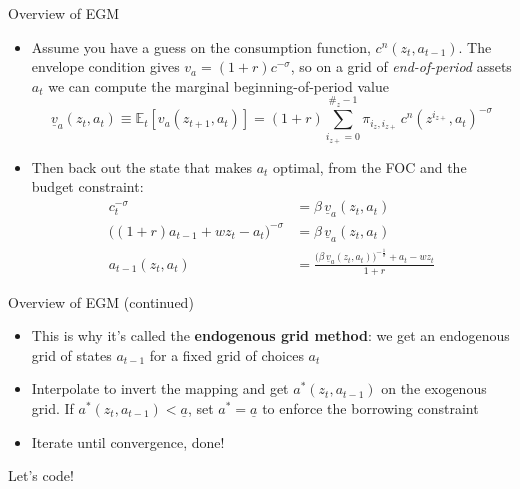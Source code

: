 \documentclass[
  10pt,
  ignorenonframetext,
  aspectratio=43,
  english,
]{beamer}
\providecommand{\tightlist}{%
  \setlength{\itemsep}{0pt}\setlength{\parskip}{0pt}}
\begin{document}
\begin{frame}{Overview of EGM}
\protect{}\label{overview-of-egm}
\begin{itemize}
\tightlist
\item
  Assume you have a guess on the consumption function,
  \(c^{n}(z_{t},a_{t-1})\). The envelope condition gives
  \(v_{a}=(1+r)c^{-\sigma}\), so on a grid of \emph{end-of-period}
  assets \(a_{t}\) we can compute the marginal beginning-of-period value
  \[
  \underline{v}_{a}(z_{t},a_{t})\equiv \mathbb{E}_{t}\left[v_{a}(z_{t+1},a_{t})\right] = (1+r)\sum^{\#_{z}-1}_{i_{z+}=0}\pi_{i_{z},i_{z+}}\,c^{n}(z^{i_{z+}},a_{t})^{-\sigma}
  \]
\item
  Then back out the state that makes \(a_{t}\) optimal, from the FOC and
  the budget constraint: \[\begin{aligned}
    c_{t}^{-\sigma} &= \beta\,\underline{v}_{a}(z_{t},a_{t}) \\
    \big((1+r)a_{t-1}+wz_{t}-a_{t}\big)^{-\sigma} &= \beta\,\underline{v}_{a}(z_{t},a_{t}) \\
    a_{t-1}(z_{t},a_{t}) &= \frac{\big(\beta\,\underline{v}_{a}(z_{t},a_{t})\big)^{-\frac{1}{\sigma}}+a_{t}-w z_{t}}{1+r}
  \end{aligned}\]
\end{itemize}
\end{frame}

\begin{frame}{Overview of EGM (continued)}
\protect{}\label{overview-of-egm-continued}
\begin{itemize}
\tightlist
\item
  This is why it's called the \textbf{endogenous grid method}: we get an
  endogenous grid of states \(a_{t-1}\) for a fixed grid of choices
  \(a_t\)
\item
  Interpolate to invert the mapping and get \(a^{\ast}(z_t,a_{t-1})\) on
  the exogenous grid. If \(a^{\ast}(z_t,a_{t-1})< \underline{a}\), set
  \(a^{\ast}=\underline{a}\) to enforce the borrowing constraint
\item
  Iterate until convergence, done!
\end{itemize}
\end{frame}

\begin{frame}{}
\protect{}\label{section-4}
\begin{center}
\LARGE Let's code!
\end{center}
\end{frame}
\end{document}

